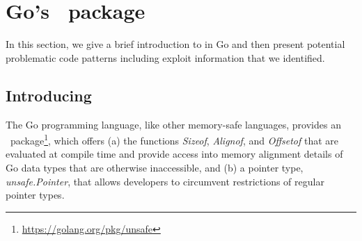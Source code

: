 \section{Go's \unsafe{}~package}
\label{sec:background}

In this section, we give a brief introduction to \unsafe{} in Go and then present potential problematic code patterns including exploit information that we identified.

\subsection{Introducing \unsafe{}}
\label{sec:back:intro}

The Go programming language, like other memory-safe languages, provides an \unsafe{}~package\footnote{\url{https://golang.org/pkg/unsafe}}, which offers 
(a) the functions \textit{Sizeof}, \textit{Alignof}, and \textit{Offsetof} that are evaluated at compile time and provide access into memory alignment details of Go data types that are otherwise inaccessible, %
and (b) a pointer type, \textit{unsafe.Pointer}, that allows developers to circumvent restrictions of regular pointer types.

